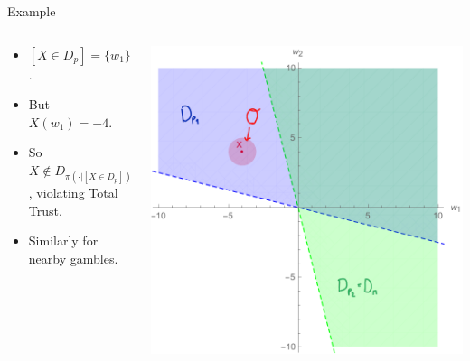 \documentclass[aspectratio=169, dvipsnames]{beamer}
\begin{document}
\begin{frame}{Example}
  \begin{columns}
    \begin{column}{.38\linewidth}
      \begin{itemize}
      \item $[X \in D_p] = \{w_1\}$.
      \item But $X(w_1) = -4$.
      \item So $X \notin D_{\pi(\cdot| [X \in D_p])}$, violating Total Trust.
      \item Similarly for nearby gambles.
      \end{itemize}
    \end{column}
    \begin{column}{.6\linewidth}
      \begin{center}
        \includegraphics[width=.92\textwidth]{TTFailure2.pdf}
      \end{center}
    \end{column}
  \end{columns}
\end{frame}
\end{document}

